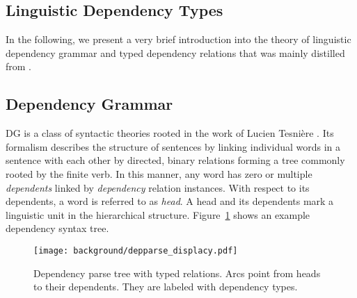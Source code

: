 \subsection{Linguistic Dependency Types}
In the following, we present a very brief introduction into the theory of linguistic dependency grammar and typed dependency relations that was mainly distilled from \textcite{jurafsky_dependency_2014}.

\subsection{Dependency Grammar}
\ac{DG} is a class of syntactic theories rooted in the work of Lucien Tesni\`{e}re \autocite{tesniere_elements_1976}. Its formalism describes the structure of sentences by linking individual words in a sentence with each other by directed, binary relations forming a tree commonly rooted by the finite verb. In this manner, any word has zero or multiple \textit{dependents} linked by \textit{dependency} relation instances. With respect to its dependents, a word is referred to as \textit{head}. A head and its dependents mark a linguistic unit in the hierarchical structure. Figure~\ref{fig:displacy_deps} shows an example dependency syntax tree.

\begin{figure}[htb!]
  \centering
  \texttt{[image: background/depparse\_displacy.pdf]}
  \caption{Dependency parse tree with typed relations. Arcs point from heads to their dependents. They are labeled with dependency types.}
  \label{fig:displacy_deps}
 \end{figure}


